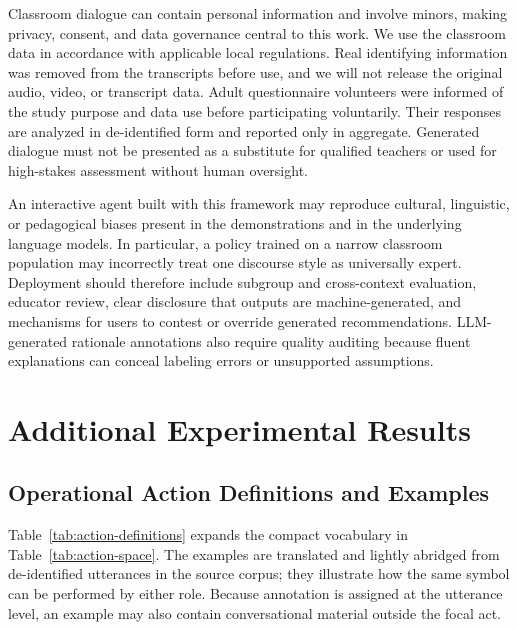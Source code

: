 \documentclass[manuscript,review,anonymous]{acmart}
\begin{document}
Classroom dialogue can contain personal information and involve minors, making privacy, consent, and data governance central to this work.
We use the classroom data in accordance with applicable local regulations. Real identifying information was removed from the transcripts before use, and we will not release the original audio, video, or transcript data.
Adult questionnaire volunteers were informed of the study purpose and data use
before participating voluntarily. Their responses are analyzed in de-identified
form and reported only in aggregate.
Generated dialogue must not be presented as a substitute for qualified teachers or used for high-stakes assessment without human oversight.

An interactive agent built with this framework may reproduce cultural,
linguistic, or pedagogical biases present in the demonstrations and in the
underlying language models.
In particular, a policy trained on a narrow classroom population may incorrectly treat one discourse style as universally expert.
Deployment should therefore include subgroup and cross-context evaluation, educator review, clear disclosure that outputs are machine-generated, and mechanisms for users to contest or override generated recommendations.
LLM-generated rationale annotations also require quality auditing because fluent explanations can conceal labeling errors or unsupported assumptions.




\clearpage
\appendix
\section{Additional Experimental Results}
\label{sec:additional-results}

\subsection{Operational Action Definitions and Examples}
\label{sec:action-definitions}

Table~\ref{tab:action-definitions} expands the compact vocabulary in
Table~\ref{tab:action-space}. The examples are translated and lightly abridged
from de-identified utterances in the source corpus; they illustrate how
the same symbol can be performed by either role. Because annotation is assigned
at the utterance level, an example may also contain conversational material
outside the focal act.
\end{document}
